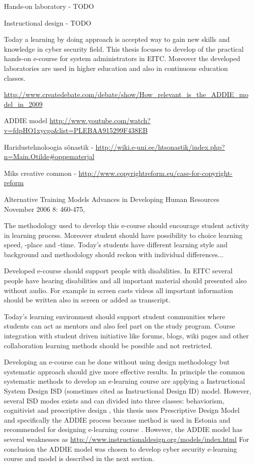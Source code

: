 Hands-on laboratory - {\color{red} TODO }

Instructional design - {\color{red} TODO }

Today a learning by doing approach is accepted way to gain new skills and knowledge in cyber security field. This thesis focuses to develop of the practical hands-on e-course for system administrators in \gls{EITC}. Moreover the developed laboratories are used in higher education and also in continuous education classes.



\url{http://www.createdebate.com/debate/show/How_relevant_is_the_ADDIE_model_in_2009}

ADDIE model \url{http://www.youtube.com/watch?v=fdpHO1xycgo&list=PLEBAA915299F438EB}


Haridustehnoloogia sõnastik - \url{http://wiki.e-uni.ee/htsonastik/index.php?n=Main.Otilde#oppematerjal}

Miks creative common - \url{http://www.copyrightreform.eu/case-for-copyright-reform}

Alternative Training Models
Advances in Developing Human Resources November 2006 8: 460-475,


The methodology used to develop this e-course should encourage student activity in learning process. Moreover student should have possibility to choice learning speed, -place and -time. Today's students have different learning style and background and methodology should reckon with individual differences...

Developed e-course should support people with disabilities. In \gls{EITC} several people have hearing disabilities and all important material should presented also without audio. For example in screen casts videos all important information should be written also in screen or added as transcript.

Today’s learning environment should support student communities where students can act as mentors and also feel part on the study program. Course integration with student driven initiative like forums, blogs, wiki pages and other collaboration learning methods should be possible and not restricted.


Developing an e-course can be done without using design methodology but systematic approach should give more effective results. In principle the common systematic methods to develop an e-learning course are applying a Instructional System Design \gls{ISD} (sometimes cited as  Instructional Design \gls{ID}) model. However, several \gls{ISD} modes exists and can divided into three classes: behaviorism, cognitivist and prescriptive design \citep{website:id_models}, this thesis uses Prescriptive Design Model and specifically the \gls{ADDIE} process because method is used in Estonia and recommended for designing e-learning course \citep[p.~5]{OppeArenduskeskus2010}. However, the \gls{ADDIE} model has several weaknesses as \url{http://www.instructionaldesign.org/models/index.html}
For conclusion the \gls{ADDIE} model was chosen to develop cyber security e-learning course and model is described in the next section.

